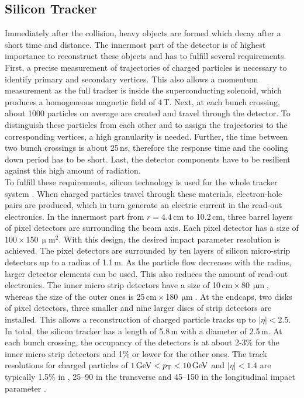 \subsection*{Silicon Tracker}
Immediately after the collision, heavy objects are formed which decay after a short time and distance. The innermost part of the detector is of highest importance to reconstruct these objects and has to fulfill several requirements. First, a precise measurement of trajectories of charged particles is necessary to identify primary and secondary vertices. This also allows a momentum measurement as the full tracker is inside the superconducting solenoid, which produces a homogeneous magnetic field of 4\,T. Next, at each bunch crossing, about 1000 particles on average are created and travel through the detector. To distinguish these particles from each other and to assign the trajectories to the corresponding vertices, a high granularity is needed. Further, the time between two bunch crossings is about 25\,ns, therefore the response time and the cooling down period has to be short. Last, the detector components have to be resilient against this high amount of radiation.\\

To fulfill these requirements, silicon technology is used for the whole tracker system \cite{tracker}. When charged particles travel through these materials, electron-hole pairs are produced, which in turn generate an electric current in the read-out electronics. In the innermost part from $r=4.4$\,cm to 10.2\,cm, three barrel layers of pixel detectors are surrounding the beam axis. Each pixel detector has a size of 100\,$\times$\,150\,$\upmu \textrm{m}^2$. With this design, the desired impact parameter resolution is achieved. The pixel detectors are surrounded by ten layers of silicon micro-strip detectors up to a radius of 1.1\,m. As the particle flow decreases with the radius, larger detector elements can be used. This also reduces the amount of read-out electronics. The inner micro strip detectors have a size of 10\,$\textrm{cm}$\,$\times$\,80\,$\upmu \textrm{m}$, whereas the size of the outer ones is 25\,$\textrm{cm}$\,$\times$\,180\,$\upmu \textrm{m}$. 
At the endcaps, two disks of pixel detectors, three smaller and nine larger discs of strip detectors are installed. This allows a reconstruction of charged particle tracks up to $|\eta| < 2.5$. In total, the silicon tracker has a length of 5.8\,m with a diameter of 2.5\,m. At each bunch crossing, the occupancy of the detectors is at about 2-3\% for the inner micro strip detectors and 1\% or lower for the other ones. The track resolutions for charged particles of $1\,\mathrm{GeV} < p_\mathrm{T} < 10\,\mathrm{GeV}$ and $|\eta| < 1.4$ are typically 1.5\% in \pt, 25--90 \mum in the transverse and 45--150 \mum in the longitudinal impact parameter \cite{trackerPerformance}.


